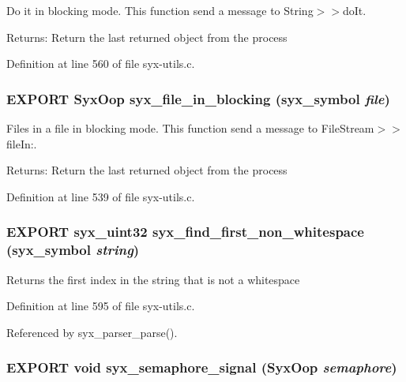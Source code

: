Do it in blocking mode. This function send a message to String$>$$>$doIt.

\begin{Desc}
\item[Returns:]Return the last returned object from the process \end{Desc}


Definition at line 560 of file syx-utils.c.\hypertarget{syx-utils_8h_fa9f19b7a2fc29dc3b06a5d21e894040}{
\subsubsection{\setlength{\rightskip}{0pt plus 5cm}EXPORT {\bf SyxOop} syx\_\-file\_\-in\_\-blocking ({\bf syx\_\-symbol} {\em file})}}
\label{syx-utils_8h_fa9f19b7a2fc29dc3b06a5d21e894040}


Files in a file in blocking mode. This function send a message to FileStream$>$$>$fileIn:.

\begin{Desc}
\item[Returns:]Return the last returned object from the process \end{Desc}


Definition at line 539 of file syx-utils.c.\hypertarget{syx-utils_8h_c13460f83b6da41da4c7181730fe5673}{
\subsubsection{\setlength{\rightskip}{0pt plus 5cm}EXPORT {\bf syx\_\-uint32} syx\_\-find\_\-first\_\-non\_\-whitespace ({\bf syx\_\-symbol} {\em string})}}
\label{syx-utils_8h_c13460f83b6da41da4c7181730fe5673}


Returns the first index in the string that is not a whitespace 

Definition at line 595 of file syx-utils.c.

Referenced by syx\_\-parser\_\-parse().\hypertarget{syx-utils_8h_a326bae67d329a47893ba0224ae445df}{
\subsubsection{\setlength{\rightskip}{0pt plus 5cm}EXPORT void syx\_\-semaphore\_\-signal ({\bf SyxOop} {\em semaphore})}}
\label{syx-utils_8h_a326bae67d329a47893ba0224ae445df}


